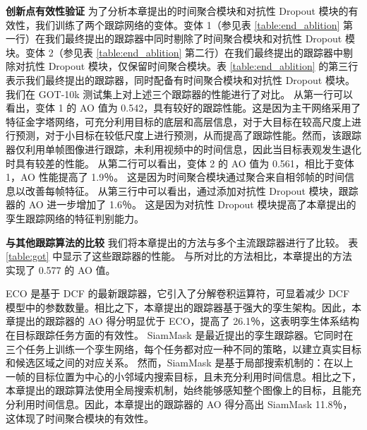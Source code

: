 \textbf{创新点有效性验证}
为了分析本章提出的时间聚合模块和对抗性 Dropout 模块的有效性，我们训练了两个跟踪网络的变体。变体 1（参见表 \ref{table:end_ablition} 第一行）在我们最终提出的跟踪器中同时剔除了时间聚合模块和对抗性 Dropout 模块。变体 2（参见表 \ref{table:end_ablition} 第二行）在我们最终提出的跟踪器中剔除对抗性 Dropout 模块，仅保留时间聚合模块。表 \ref{table:end_ablition} 的第三行表示我们最终提出的跟踪器，同时配备有时间聚合模块和对抗性 Dropout 模块。
我们在 GOT-10k 测试集上对上述三个跟踪器的性能进行了对比。
从第一行可以看出，变体 1 的 AO 值为 0.542，具有较好的跟踪性能。这是因为主干网络采用了特征金字塔网络，可充分利用目标的底层和高层信息，对于大目标在较高尺度上进行预测，对于小目标在较低尺度上进行预测，从而提高了跟踪性能。然而，该跟踪器仅利用单帧图像进行跟踪，未利用视频中的时间信息，因此当目标表观发生退化时具有较差的性能。
从第二行可以看出，变体 2 的 AO 值为 0.561，相比于变体 1，AO 性能提高了 1.9％。
这是因为时间聚合模块通过聚合来自相邻帧的时间信息以改善每帧特征。
从第三行中可以看出，通过添加对抗性 Dropout 模块，跟踪器的 AO 进一步增加了 1.6％。
这是因为对抗性 Dropout 模块提高了本章提出的孪生跟踪网络的特征判别能力。

\textbf{与其他跟踪算法的比较}
我们将本章提出的方法与多个主流跟踪器进行了比较。
表 \ref{table:got} 中显示了这些跟踪器的性能。
与所对比的方法相比，本章提出的方法实现了 0.577 的 AO 值。

ECO \cite{danelljan2017eco} 是基于 DCF 的最新跟踪器，它引入了分解卷积运算符，可显着减少 DCF 模型中的参数数量。相比之下，本章提出的跟踪器基于强大的孪生架构。因此，本章提出的跟踪器的 AO 得分明显优于 ECO，提高了 26.1％，这表明孪生体系结构在目标跟踪任务方面的有效性。
SiamMask \cite{Wang2018SiamMask} 是最近提出的孪生跟踪器。它同时在三个任务上训练一个孪生网络，每个任务都对应一种不同的策略，以建立真实目标和候选区域之间的对应关系。
然而，SiamMask 是基于局部搜索机制的：在以上一帧的目标位置为中心的小邻域内搜索目标，且未充分利用时间信息。相比之下，本章提出的跟踪算法使用全局搜索机制，始终能够感知整个图像上的目标，且能充分利用时间信息。因此，本章提出的跟踪器的 AO 得分高出 SiamMask 11.8％，这体现了时间聚合模块的有效性。

